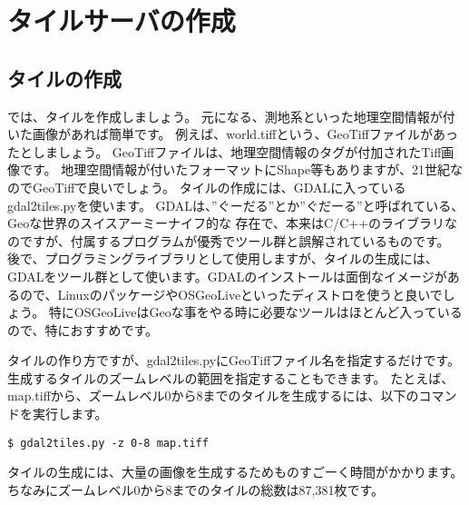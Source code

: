 \chapter*{タイルサーバの作成}

\section*{タイルの作成}
では、タイルを作成しましょう。
元になる、測地系といった地理空間情報が付いた画像があれば簡単です。
例えば、world.tiffという、GeoTiffファイルがあったとしましょう。
GeoTiffファイルは、地理空間情報のタグが付加されたTiff画像です。
地理空間情報が付いたフォーマットにShape等もありますが、21世紀なのでGeoTiffで良いでしょう。
タイルの作成には、GDALに入っているgdal2tiles.pyを使います。
GDALは、''ぐーだる''とか''ぐだーる''と呼ばれている、Geoな世界のスイスアーミーナイフ的な
存在で、本来はC/C++のライブラリなのですが、付属するプログラムが優秀でツール群と誤解されているものです。
後で、プログラミングライブラリとして使用しますが、タイルの生成には、GDALをツール群として使います。GDALのインストールは面倒なイメージがあるので、LinuxのパッケージやOSGeoLiveといったディストロを使うと良いでしょう。
特にOSGeoLiveはGeoな事をやる時に必要なツールはほとんど入っているので、特におすすめです。

タイルの作り方ですが、gdal2tiles.pyにGeoTiffファイル名を指定するだけです。
生成するタイルのズームレベルの範囲を指定することもできます。
たとえば、map.tiffから、ズームレベル0から8までのタイルを生成するには、以下のコマンドを実行します。

\texttt{\$ gdal2tiles.py -z 0-8 map.tiff}

タイルの生成には、大量の画像を生成するためものすごーく時間がかかります。
ちなみにズームレベル0から8までのタイルの総数は87,381枚です。


